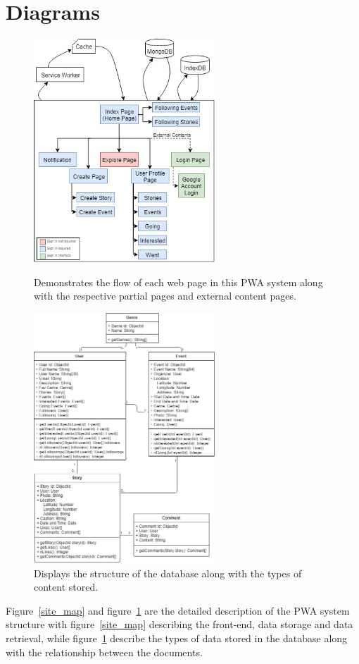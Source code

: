 \documentclass[11pt, a4paper]{article}
\begin{document}
\section{Diagrams}
\begin{figure}[H]
  \begin{center}
    \begin{minipage}[b]{0.4\textwidth}
      \includegraphics[width=6.8cm]{site_map.jpg}
      \caption{Demonstrates the flow of each web page in this PWA system along with the respective
      partial pages and external content pages.}
      \label{site_map}
    \end{minipage}
    \qquad
    \begin{minipage}[b]{0.4\textwidth}
      \includegraphics[width=6.8cm]{uml.jpg}
      \caption{Displays the structure of the database along with the types of content stored.}
      \label{uml}
    \end{minipage}
  \end{center}
\end{figure}
Figure~\ref{site_map} and figure~\ref{uml} are the detailed description of the PWA system structure
with figure~\ref{site_map} describing the front-end, data storage and data retrieval, while
figure~\ref{uml} describe the types of data stored in the database along with the relationship
between the documents.
\end{document}
